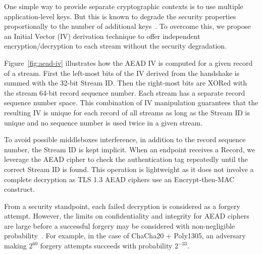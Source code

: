 One simple way to provide separate cryptographic contexts is to use multiple application-level
keys. But this is known to degrade the security properties proportionally to the number of
additional keys~\cite{chatterjee2011another}. To overcome this, we propose an
Initial Vector (IV) derivation technique to offer independent
encryption/decryption to each stream without the security degradation.

Figure~\ref{fig:aead-iv} illustrates how the AEAD IV is computed for a 
given \tcpls record of a \tcpls stream. First the left-most bits of the IV derived from the \tls handshake
is summed with the 32-bit \tcpls Stream ID. Then the right-most bits are XORed with the
stream 64-bit record sequence number. Each \tcpls stream has a separate record
sequence number space. This combination of IV manipulation guarantees that the
resulting IV is unique for each record of all \tcpls streams as long as the
Stream ID is unique and no sequence number is used twice in a given stream.

To avoid possible middleboxes interference, in addition to the record sequence number, 
the \tcpls Stream ID is kept implicit. When an endpoint receives a \tcpls Record, 
we leverage the AEAD cipher to check the authentication tag repeatedly until the
correct \tcpls Stream ID is found. This operation is lightweight as it does not
involve a complete decryption as TLS 1.3 AEAD ciphers use an Encrypt-then-MAC construct.

From a security standpoint, each failed decryption is considered as a
forgery attempt. However, the limits on confidentiality and
integrity for AEAD ciphers are large before a
successful forgery may be considered with non-negligible probability~\cite{luykx2015limits, aeadlimits}. For
example, in the case of ChaCha20 + Poly1305, an adversary making $2^{60}$ forgery
attempts succeeds with probability $2^{-33}$.


%

